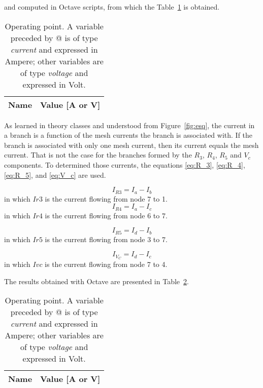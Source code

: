 and computed in Octave scripts, from which the Table~\ref{tab:op1} is obtained.

\begin{table}[h]
  \centering
  \begin{tabular}{|l|r|}
    \hline    
    {\bf Name} & {\bf Value [A or V]} \\ \hline
    
  \end{tabular}
  \caption{Operating point. A variable preceded by @ is of type {\em current}
    and expressed in Ampere; other variables are of type {\it voltage} and expressed in
    Volt.}
  \label{tab:op1}
\end{table}

As learned in theory classes and understood from Figure~\ref{fig:esq}, the current in a branch is a function of the mesh currents the branch is associated with. If the branch is associated with only one mesh current, then its current equals the mesh current. That is not the case for the branches formed by the $R_3$, $R_4$, $R_5$ and $V_c$ components. To determined those currents, the equations \ref{eq:R_3}, \ref{eq:R_4}, \ref{eq:R_5}, and \ref{eq:V_c} are used.

\begin{equation}
  I_{R3}=I_a-I_b
  \label{eq:R_3}
\end{equation}
in which $Ir3$ is the current flowing from node 7 to 1.
\begin{equation}
  I_{R4}=I_a-I_c
  \label{eq:R_4}
\end{equation}
in which $Ir4$ is the current flowing from node 6 to 7.

\begin{equation}
  I_{R5}=I_d-I_b
  \label{eq:R_5}
\end{equation}
in which $Ir5$ is the current flowing from node 3 to 7.

\begin{equation}
  I_{V_C}=I_d-I_c
  \label{eq:V_c}
\end{equation}
in which $Ivc$ is the current flowing from node 7 to 4.

The results obtained with Octave are presented in Table~\ref{tab:op2}.

\begin{table}[h]
  \centering
  \begin{tabular}{|l|r|}
    \hline    
    {\bf Name} & {\bf Value [A or V]} \\ \hline
    
  \end{tabular}
  \caption{Operating point. A variable preceded by @ is of type {\em current}
    and expressed in Ampere; other variables are of type {\it voltage} and expressed in
    Volt.}
  \label{tab:op2}
\end{table}



